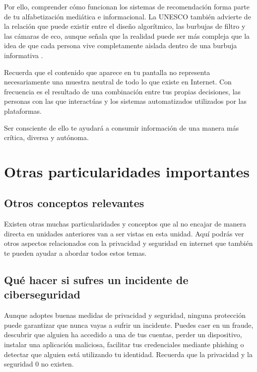 \documentclass[
  spanish,
  a4paper,
  openany]{book}
\begin{document}
Por ello, comprender cómo funcionan los sistemas de recomendación forma parte de tu alfabetización mediática e informacional. La UNESCO también advierte de la relación que puede existir entre el diseño algorítmico, las burbujas de filtro y las cámaras de eco, aunque señala que la realidad puede ser más compleja que la idea de que cada persona vive completamente aislada dentro de una burbuja informativa \citep{UNESCO-alfabetizacion-mediatica}.

Recuerda que el contenido que aparece en tu pantalla no representa necesariamente una muestra neutral de todo lo que existe en Internet. Con frecuencia es el resultado de una combinación entre tus propias decisiones, las personas con las que interactúas y los sistemas automatizados utilizados por las plataformas.

Ser consciente de ello te ayudará a consumir información de una manera más crítica, diversa y autónoma.

\chapter{Otras particularidades importantes}\label{otras-particularidades-importantes}

\section{Otros conceptos relevantes}\label{otros-conceptos-relevantes}

Existen otras muchas particularidades y conceptos que al no encajar de manera directa en unidades anteriores van a ser vistas en esta unidad. Aquí podrás ver otros aspectos relacionados con la privacidad y seguridad en internet que también te pueden ayudar a abordar todos estos temas.

\section{Qué hacer si sufres un incidente de ciberseguridad}\label{quuxe9-hacer-si-sufres-un-incidente-de-ciberseguridad}

Aunque adoptes buenas medidas de privacidad y seguridad, ninguna protección puede garantizar que nunca vayas a sufrir un incidente. Puedes caer en un fraude, descubrir que alguien ha accedido a una de tus cuentas, perder un dispositivo, instalar una aplicación maliciosa, facilitar tus credenciales mediante phishing o detectar que alguien está utilizando tu identidad. Recuerda que la privacidad y la seguridad 0 no existen.
\end{document}
